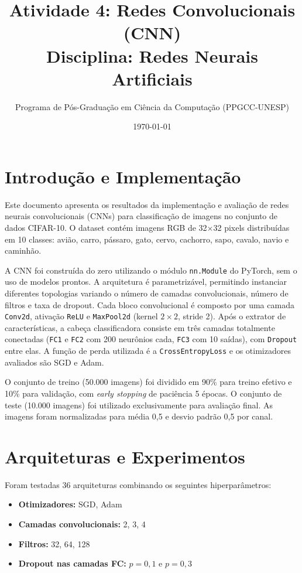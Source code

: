 \documentclass[12pt,a4paper]{article}
\title{Atividade 4: Redes Convolucionais (CNN) \\ \large Disciplina: Redes Neurais Artificiais}
\author{Programa de Pós-Graduação em Ciência da Computação (PPGCC-UNESP)}
\date{\today}
\begin{document}
\maketitle

\section{Introdução e Implementação}

Este documento apresenta os resultados da implementação e avaliação de redes neurais convolucionais (CNNs) para classificação de imagens no conjunto de dados CIFAR-10. O dataset contém imagens RGB de 32$\times$32 pixels distribuídas em 10 classes: avião, carro, pássaro, gato, cervo, cachorro, sapo, cavalo, navio e caminhão.

A CNN foi construída do zero utilizando o módulo \texttt{nn.Module} do PyTorch, sem o uso de modelos prontos. A arquitetura é parametrizável, permitindo instanciar diferentes topologias variando o número de camadas convolucionais, número de filtros e taxa de dropout. Cada bloco convolucional é composto por uma camada \texttt{Conv2d}, ativação \texttt{ReLU} e \texttt{MaxPool2d} (kernel $2\times2$, stride 2). Após o extrator de características, a cabeça classificadora consiste em três camadas totalmente conectadas (\texttt{FC1} e \texttt{FC2} com 200 neurônios cada, \texttt{FC3} com 10 saídas), com \texttt{Dropout} entre elas. A função de perda utilizada é a \texttt{CrossEntropyLoss} e os otimizadores avaliados são SGD e Adam.

O conjunto de treino (50.000 imagens) foi dividido em 90\% para treino efetivo e 10\% para validação, com \textit{early stopping} de paciência 5 épocas. O conjunto de teste (10.000 imagens) foi utilizado exclusivamente para avaliação final. As imagens foram normalizadas para média 0,5 e desvio padrão 0,5 por canal.

\section{Arquiteturas e Experimentos}

Foram testadas 36 arquiteturas combinando os seguintes hiperparâmetros:

\begin{itemize}
    \item \textbf{Otimizadores:} SGD, Adam
    \item \textbf{Camadas convolucionais:} 2, 3, 4
    \item \textbf{Filtros:} 32, 64, 128
    \item \textbf{Dropout nas camadas FC:} $p = 0{,}1$ e $p = 0{,}3$
\end{itemize}
\end{document}
